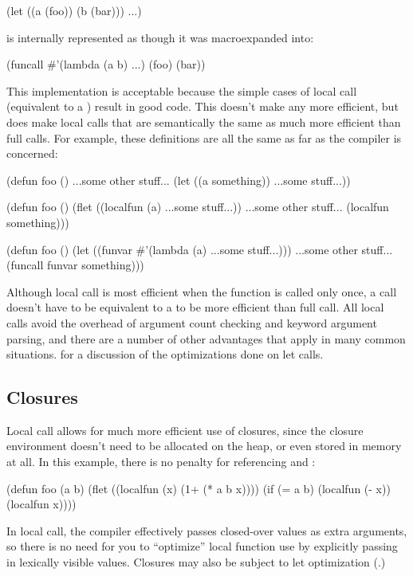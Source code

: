 \begin{example}
(let ((a (foo))
      (b (bar)))
  ...)
\end{example}

is internally represented as though it was macroexpanded into:

\begin{example}
(funcall #'(lambda (a b)
             ...)
         (foo)
         (bar))
\end{example}

This implementation is acceptable because the simple cases of local
call (equivalent to a ) result in good code.  This doesn't
make  any more efficient, but does make local calls that are
semantically the same as  much more efficient than full
calls.  For example, these definitions are all the same as far as the
compiler is concerned:

\begin{example}
(defun foo ()
  ...some other stuff...
  (let ((a something))
    ...some stuff...))

(defun foo ()
  (flet ((localfun (a)
           ...some stuff...))
    ...some other stuff...
    (localfun something)))

(defun foo ()
  (let ((funvar #'(lambda (a)
                    ...some stuff...)))
    ...some other stuff...
    (funcall funvar something)))
\end{example}

Although local call is most efficient when the function is called only
once, a call doesn't have to be equivalent to a  to be more
efficient than full call.  All local calls avoid the overhead of
argument count checking and keyword argument parsing, and there are a
number of other advantages that apply in many common situations.
 for a discussion of the optimizations done on
let calls.


\subsection{Closures}

Local call allows for much more efficient use of closures, since the
closure environment doesn't need to be allocated on the heap, or even
stored in memory at all.  In this example, there is no penalty for
 referencing  and :
\begin{lisp}
(defun foo (a b)
  (flet ((localfun (x)
           (1+ (* a b x))))
    (if (= a b)
        (localfun (- x))
        (localfun x))))
\end{lisp}
In local call, the compiler effectively passes closed-over values as
extra arguments, so there is no need for you to ``optimize'' local
function use by explicitly passing in lexically visible values.
Closures may also be subject to let optimization
(.)

